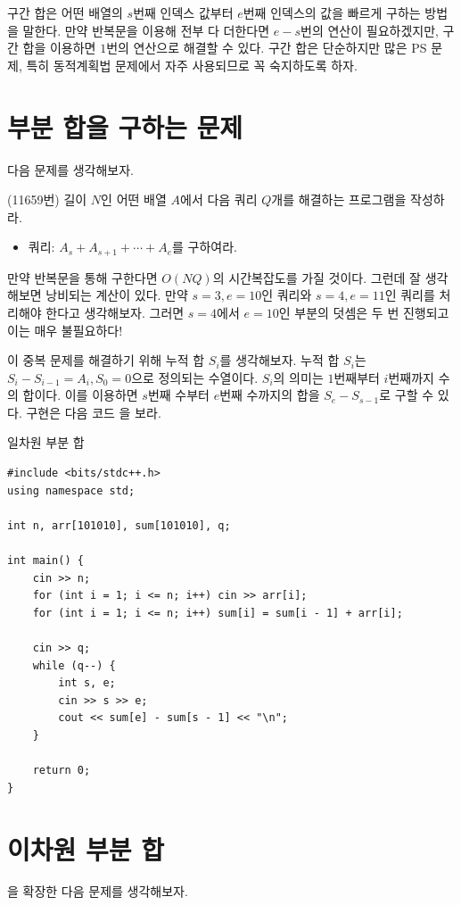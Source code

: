 구간 합은 어떤 배열의 $s$번째 인덱스 값부터 $e$번째 인덱스의 값을 빠르게 구하는 방법을 말한다. 만약 반복문을 이용해 전부 다 더한다면 $e-s$번의 연산이 필요하겠지만, 구간 합을 이용하면 $1$번의 연산으로 해결할 수 있다. 구간 합은 단순하지만 많은 PS 문제, 특히 동적계획법 문제에서 자주 사용되므로 꼭 숙지하도록 하자.

\section{부분 합을 구하는 문제}
다음 문제를 생각해보자.

\begin{example} \label{ex: 1d-sum-query}
    (11659번) 길이 $N$인 어떤 배열 $A$에서 다음 쿼리 $Q$개를 해결하는 프로그램을 작성하라.
    \begin{itemize}
        \item 쿼리: $A_s + A_{s+1} + \cdots + A_e$를 구하여라.
    \end{itemize}
\end{example}

만약 반복문을 통해 구한다면 $O(NQ)$의 시간복잡도를 가질 것이다. 그런데 잘 생각해보면 낭비되는 계산이 있다. 만약 $s=3, e=10$인 쿼리와 $s=4, e=11$인 쿼리를 처리해야 한다고 생각해보자. 그러면 $s=4$에서 $e=10$인 부분의 덧셈은 두 번 진행되고 이는 매우 불필요하다!

이 중복 문제를 해결하기 위해 누적 합 $S_i$를 생각해보자. 누적 합 $S_i$는 $S_i - S_{i-1} = A_i, S_0 = 0$으로 정의되는 수열이다. $S_i$의 의미는 $1$번째부터 $i$번째까지 수의 합이다. 이를 이용하면 $s$번째 수부터 $e$번째 수까지의 합을 $S_e - S_{s-1}$로 구할 수 있다. 구현은 다음 코드 을 보라.

\begin{code} \label{code: 1d-prefix-sum}
일차원 부분 합
\begin{lstlisting}
#include <bits/stdc++.h>
using namespace std;

int n, arr[101010], sum[101010], q;

int main() {
    cin >> n;
    for (int i = 1; i <= n; i++) cin >> arr[i];
    for (int i = 1; i <= n; i++) sum[i] = sum[i - 1] + arr[i];

    cin >> q;
    while (q--) {
        int s, e;
        cin >> s >> e;
        cout << sum[e] - sum[s - 1] << "\n";
    }

    return 0;
}
\end{lstlisting}
\end{code}

\section{이차원 부분 합}
을 확장한 다음 문제를 생각해보자.

